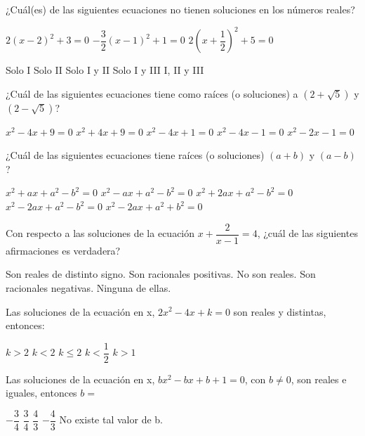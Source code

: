 \documentclass[sin nombre]{srs}
\begin{document}
\begin{preguntas}[after-item-skip=2cm]
\pregunta ¿Cuál(es) de las siguientes ecuaciones no tienen soluciones en los números reales?
\begin{verticali}
\alternativa $2\left(x - 2\right)^{2} + 3 = 0$
\alternativa $-\dfrac{3}{2}\left(x - 1\right)^{2} + 1 = 0$
\alternativa $2\left(x + \dfrac{1}{2}\right)^{2} + 5 = 0$
\end{verticali}
\begin{vertical}
\alternativa Solo I
\alternativa Solo II
\alternativa Solo I y II
\alternativa Solo I y III
\alternativa I, II y III
\end{vertical}

\pregunta ¿Cuál de las siguientes ecuaciones tiene como raíces (o soluciones) a $\left(2 + \sqrt{5}\right)$ y $\left(2 - \sqrt{5}\right)$?
\begin{vertical}
\alternativa $x^{2} - 4x + 9=0$
\alternativa $x^{2} + 4x + 9 =0$
\alternativa $x^{2} - 4x + 1 =0$
\alternativa $x^{2} - 4x - 1 = 0$
\alternativa $x^{2}-2x-1=0$
\end{vertical}

\pregunta ¿Cuál de las siguientes ecuaciones tiene raíces (o soluciones) $\left(a + b\right)$ y $\left(a - b\right)$?
\begin{vertical}
\alternativa $x^{2} + ax + a^{2} - b^{2} = 0$
\alternativa $x^{2} - ax + a^{2} - b^{2} = 0$
\alternativa $x^{2} + 2ax + a^{2} - b^{2} = 0$
\alternativa $x^{2}-2ax + a^{2} - b^{2} = 0$
\alternativa $x^{2}-2ax + a^{2} + b^{2} = 0$
\end{vertical}

\pregunta Con respecto a las soluciones de la ecuación $x + \dfrac{2}{x-1} = 4$, ¿cuál de las siguientes afirmaciones es verdadera?
\begin{vertical}
\alternativa Son reales de distinto signo.
\alternativa Son racionales positivas.
\alternativa No son reales.
\alternativa Son racionales negativas.
\alternativa Ninguna de ellas.
\end{vertical}

\pregunta Las soluciones de la ecuación en x, $2x^{2} - 4x + k = 0$ son reales y distintas, entonces:
\begin{vertical}
\alternativa $k > 2$
\alternativa $k < 2$
\alternativa $k \leq 2$
\alternativa $k < \dfrac{1}{2}$
\alternativa $k > 1$
\end{vertical}

\pregunta Las soluciones de la ecuación en x, $bx^{2} - bx + b + 1 = 0$, con $b \neq 0$, son reales e iguales, entonces $b =$
\begin{vertical}
\alternativa $-\dfrac{3}{4}$
\alternativa $\dfrac{3}{4}$
\alternativa $\dfrac{4}{3}$
\alternativa $-\dfrac{4}{3}$
\alternativa No existe tal valor de b.
\end{vertical}


\end{preguntas}
\end{document}
